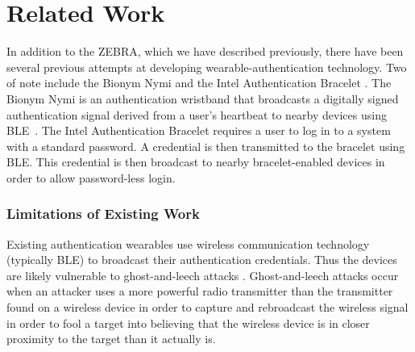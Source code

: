 \section{Related Work}\label{sec:related}

In addition to the ZEBRA, which we have described previously, there have been several previous attempts at developing wearable-authentication technology.  Two of note include the Bionym Nymi \cite{goode2014bring} and the Intel Authentication Bracelet \cite{idf2015intel}.  The Bionym Nymi is an authentication wristband that broadcasts a digitally signed authentication signal derived from a user's heartbeat to nearby devices using BLE~\cite{BLEoverview}.  The Intel Authentication Bracelet requires a user to log in to a system with a standard password.  A credential is then transmitted to the bracelet using BLE.  This credential is then broadcast to nearby bracelet-enabled devices in order to allow password-less login.

\subsubsection{Limitations of Existing Work}
Existing authentication wearables use wireless communication technology (typically BLE) to broadcast their authentication credentials.  Thus the devices are likely vulnerable to ghost-and-leech attacks \cite{czeskis2008rfids}.  Ghost-and-leech attacks occur when an attacker uses a more powerful radio transmitter than the transmitter found on a wireless device in order to capture and rebroadcast the wireless signal in order to fool a target into believing that the wireless device is in closer proximity to the target than it actually is.



